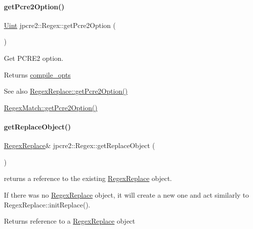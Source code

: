 \paragraph{\texorpdfstring{get\+Pcre2\+Option()}{getPcre2Option()}}
{\footnotesize\ttfamily \hyperlink{namespacejpcre2_a078242d38221a13fb3543b9edd78c099}{Uint} jpcre2\+::\+Regex\+::get\+Pcre2\+Option (\begin{DoxyParamCaption}{ }\end{DoxyParamCaption})\hspace{0.3cm}{\ttfamily [inline]}}



Get P\+C\+R\+E2 option. 

\begin{DoxyReturn}{Returns}
\hyperlink{classjpcre2_1_1Regex_a5954131e9085de63229ed5c11417df69}{compile\+\_\+opts} 
\end{DoxyReturn}
\begin{DoxySeeAlso}{See also}
\hyperlink{classjpcre2_1_1RegexReplace_ac9e158fa5dc0c4d8b27e2dd694e7bc84_ac9e158fa5dc0c4d8b27e2dd694e7bc84}{Regex\+Replace\+::get\+Pcre2\+Option()} 

\hyperlink{classjpcre2_1_1RegexMatch_a3e6e04f48cd5ee3fb9705214f746f343_a3e6e04f48cd5ee3fb9705214f746f343}{Regex\+Match\+::get\+Pcre2\+Option()} 
\end{DoxySeeAlso}
\hypertarget{classjpcre2_1_1Regex_ad0b5e492eae75ef13b3d80f4fb1e3486_ad0b5e492eae75ef13b3d80f4fb1e3486}{}\label{classjpcre2_1_1Regex_ad0b5e492eae75ef13b3d80f4fb1e3486_ad0b5e492eae75ef13b3d80f4fb1e3486} 
\paragraph{\texorpdfstring{get\+Replace\+Object()}{getReplaceObject()}}
{\footnotesize\ttfamily \hyperlink{classjpcre2_1_1RegexReplace}{Regex\+Replace}\& jpcre2\+::\+Regex\+::get\+Replace\+Object (\begin{DoxyParamCaption}{ }\end{DoxyParamCaption})\hspace{0.3cm}{\ttfamily [inline]}}



returns a reference to the existing \hyperlink{classjpcre2_1_1RegexReplace}{Regex\+Replace} object. 

If there was no \hyperlink{classjpcre2_1_1RegexReplace}{Regex\+Replace} object, it will create a new one and act similarly to Regex\+Replace\+::init\+Replace(). \begin{DoxyReturn}{Returns}
reference to a \hyperlink{classjpcre2_1_1RegexReplace}{Regex\+Replace} object 
\end{DoxyReturn}
\hypertarget{classjpcre2_1_1Regex_a1a639ae4090b88609c03e9268faf02d8_a1a639ae4090b88609c03e9268faf02d8}{}\label{classjpcre2_1_1Regex_a1a639ae4090b88609c03e9268faf02d8_a1a639ae4090b88609c03e9268faf02d8} 
